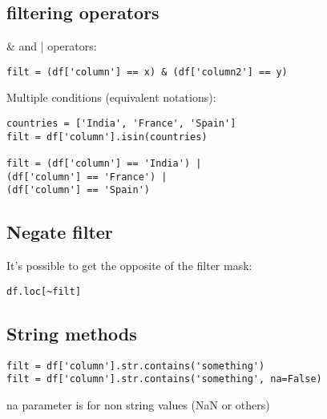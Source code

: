 \documentclass[french]{article}
\begin{document}
\subsection{filtering operators}

\& and | operators:
\begin{verbatim}
filt = (df['column'] == x) & (df['column2'] == y)
\end{verbatim}

Multiple conditions (equivalent notations):
\begin{verbatim}
countries = ['India', 'France', 'Spain']
filt = df['column'].isin(countries)

filt = (df['column'] == 'India') |
(df['column'] == 'France') |
(df['column'] == 'Spain')
\end{verbatim}

\subsection{Negate filter}
It's possible to get the opposite of the filter mask:
\begin{verbatim}
df.loc[~filt]
\end{verbatim}

\subsection{String methods}

\begin{verbatim}
filt = df['column'].str.contains('something')
filt = df['column'].str.contains('something', na=False)
\end{verbatim}
na parameter is for non string values (NaN or others)
\end{document}
